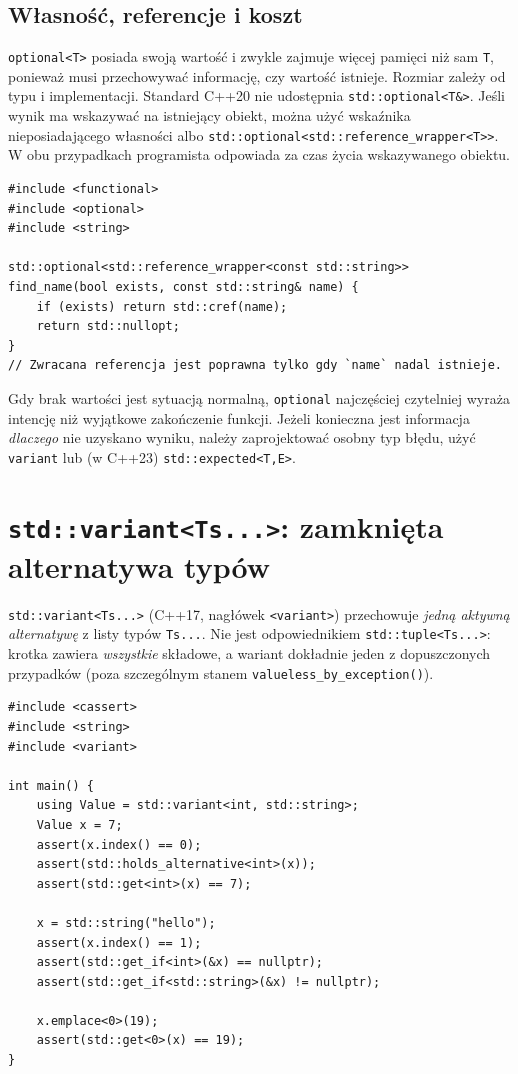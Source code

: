 \subsection{Własność, referencje i koszt}

\texttt{optional<T>} posiada swoją wartość i zwykle zajmuje więcej pamięci
niż sam \texttt{T}, ponieważ musi przechowywać informację, czy wartość
istnieje. Rozmiar zależy od typu i implementacji. Standard C++20
nie udostępnia \texttt{std::optional<T\&>}. Jeśli wynik ma wskazywać na
istniejący obiekt, można użyć wskaźnika nieposiadającego własności albo
\texttt{std::optional<std::reference\_wrapper<T>>}. W obu przypadkach
programista odpowiada za czas życia wskazywanego obiektu.

\begin{lstlisting}[caption={Opcjonalna referencja: brak przenoszenia własności; fragment.}]
#include <functional>
#include <optional>
#include <string>

std::optional<std::reference_wrapper<const std::string>>
find_name(bool exists, const std::string& name) {
    if (exists) return std::cref(name);
    return std::nullopt;
}
// Zwracana referencja jest poprawna tylko gdy `name` nadal istnieje.
\end{lstlisting}

Gdy brak wartości jest sytuacją normalną, \texttt{optional} najczęściej
czytelniej wyraża intencję niż wyjątkowe zakończenie funkcji. Jeżeli
konieczna jest informacja \emph{dlaczego} nie uzyskano wyniku, należy
zaprojektować osobny typ błędu, użyć \texttt{variant} lub (w C++23)
\texttt{std::expected<T,E>}.

\section{\texttt{std::variant<Ts...>}: zamknięta alternatywa typów}
\label{sec:cpp14-variant}

\texttt{std::variant<Ts...>} (C++17, nagłówek \texttt{<variant>})
przechowuje \emph{jedną aktywną alternatywę} z listy typów \texttt{Ts...}.
Nie jest odpowiednikiem \texttt{std::tuple<Ts...>}: krotka zawiera
\emph{wszystkie} składowe, a wariant dokładnie jeden z dopuszczonych
przypadków (poza szczególnym stanem \texttt{valueless\_by\_exception()}).

\begin{lstlisting}[caption={Tworzenie i badanie aktywnej alternatywy (C++17); kompletny program.}]
#include <cassert>
#include <string>
#include <variant>

int main() {
    using Value = std::variant<int, std::string>;
    Value x = 7;
    assert(x.index() == 0);
    assert(std::holds_alternative<int>(x));
    assert(std::get<int>(x) == 7);

    x = std::string("hello");
    assert(x.index() == 1);
    assert(std::get_if<int>(&x) == nullptr);
    assert(std::get_if<std::string>(&x) != nullptr);

    x.emplace<0>(19);
    assert(std::get<0>(x) == 19);
}
\end{lstlisting}

